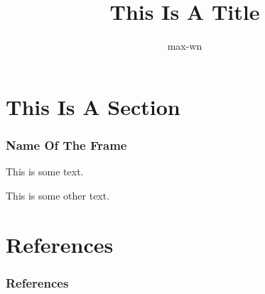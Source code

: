 \documentclass{beamer}
\title{This Is A Title}
\author{max-wn}
\institute{Name Of University}
\begin{document}
\ttfamily

\begin{frame}
\maketitle
\end{frame}

\section{This Is A Section}

\begin{frame}
\frametitle{Name Of The Frame}

This is some text.

\end{frame}

This is some other text.

\section{References}

\begin{frame}
\frametitle{References}
\printbibliography
\end{frame}
\end{document}
